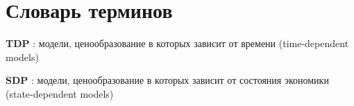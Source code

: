\chapter*{Словарь терминов}             %
%
\textbf{TDP} : модели, ценообразование в которых зависит от времени (time-dependent models)

\textbf{SDP} : модели, ценообразование в которых зависит от состояния экономики (state-dependent models)
%
